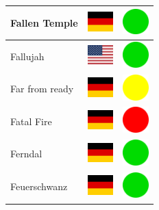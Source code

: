 \documentclass[12pt, a4paper, twoside]{report}
\begin{document}
\begin{center}
\begin{longtable}{|p{5cm}|p{2cm}|p{2cm}|}
 Fallen Temple                                              & \includegraphics[width=1cm]{../4x3/de} &   \includegraphics[width=1cm]{../likes/y} \\ \hline
 Fallujah                                                   & \includegraphics[width=1cm]{../4x3/us} &   \includegraphics[width=1cm]{../likes/y} \\ \hline
 Far from ready                                             & \includegraphics[width=1cm]{../4x3/de} &   \includegraphics[width=1cm]{../likes/m} \\ \hline
 Fatal Fire                                                 & \includegraphics[width=1cm]{../4x3/de} &   \includegraphics[width=1cm]{../likes/n} \\ \hline
 Ferndal                                                    & \includegraphics[width=1cm]{../4x3/de} &   \includegraphics[width=1cm]{../likes/y} \\ \hline
 Feuerschwanz                                               & \includegraphics[width=1cm]{../4x3/de} &   \includegraphics[width=1cm]{../likes/y} \\ \hline

\end{longtable}
\end{center}
\end{document}

